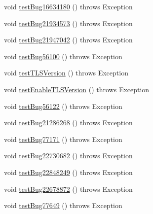 \begin{DoxyCompactItemize}
\item 
void \mbox{\hyperlink{classtestsuite_1_1regression_1_1_connection_regression_test_a93aad983034e220127a84017e297d492}{test\+Bug16634180}} ()  throws Exception 
\item 
void \mbox{\hyperlink{classtestsuite_1_1regression_1_1_connection_regression_test_a1cbe215e0e75477350d50bfaa49af95e}{test\+Bug21934573}} ()  throws Exception 
\item 
void \mbox{\hyperlink{classtestsuite_1_1regression_1_1_connection_regression_test_a071fe5a492bac37a1a3f0c9326d44ed8}{test\+Bug21947042}} ()  throws Exception 
\item 
void \mbox{\hyperlink{classtestsuite_1_1regression_1_1_connection_regression_test_a5b74dbc899a9fefe265aabac1e1818ce}{test\+Bug56100}} ()  throws Exception 
\item 
void \mbox{\hyperlink{classtestsuite_1_1regression_1_1_connection_regression_test_a8a5b38389d6365d90769f30887196749}{test\+T\+L\+S\+Version}} ()  throws Exception 
\item 
void \mbox{\hyperlink{classtestsuite_1_1regression_1_1_connection_regression_test_aaf770f994d6d32e25429a79c91cbc18b}{test\+Enable\+T\+L\+S\+Version}} ()  throws Exception 
\item 
void \mbox{\hyperlink{classtestsuite_1_1regression_1_1_connection_regression_test_a01aacf5829d6396bc8569ffc5b6679b8}{test\+Bug56122}} ()  throws Exception 
\item 
void \mbox{\hyperlink{classtestsuite_1_1regression_1_1_connection_regression_test_ab5a03581f2da17e71bf3d9449439c888}{test\+Bug21286268}} ()  throws Exception 
\item 
void \mbox{\hyperlink{classtestsuite_1_1regression_1_1_connection_regression_test_adca05ee2426734f0d6b5bdf2c98ceeef}{test\+Bug77171}} ()  throws Exception 
\item 
void \mbox{\hyperlink{classtestsuite_1_1regression_1_1_connection_regression_test_a415dfcfbf9a9c7542bc8defe119ee97c}{test\+Bug22730682}} ()  throws Exception 
\item 
void \mbox{\hyperlink{classtestsuite_1_1regression_1_1_connection_regression_test_a9c80414050a22a9ebafdb247f107d6f2}{test\+Bug22848249}} ()  throws Exception 
\item 
void \mbox{\hyperlink{classtestsuite_1_1regression_1_1_connection_regression_test_a36543b7a9aa8ea81c2e039db4955494c}{test\+Bug22678872}} ()  throws Exception 
\item 
void \mbox{\hyperlink{classtestsuite_1_1regression_1_1_connection_regression_test_ad3b1937f8602e34bfceaeaf3229c9e68}{test\+Bug77649}} ()  throws Exception 

\end{DoxyCompactItemize}
